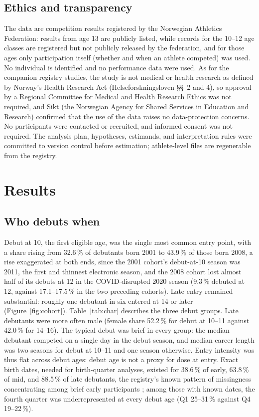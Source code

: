 \documentclass[12pt,a4paper]{article}
\begin{document}
\subsection{Ethics and transparency}

The data are competition results registered by the Norwegian Athletics Federation: results from age 13 are publicly listed, while records for the 10--12 age classes are registered but not publicly released by the federation, and for those ages only participation itself (whether and when an athlete competed) was used. No individual is identified and no performance data were used. As for the companion registry studies, the study is not medical or health research as defined by Norway's Health Research Act (Helseforskningsloven \S\S~2 and 4), so approval by a Regional Committee for Medical and Health Research Ethics was not required, and Sikt (the Norwegian Agency for Shared Services in Education and Research) confirmed that the use of the data raises no data-protection concerns. No participants were contacted or recruited, and informed consent was not required. The analysis plan, hypotheses, estimands, and interpretation rules were committed to version control before estimation; athlete-level files are regenerable from the registry.

\section{Results}

\subsection{Who debuts when}

Debut at 10, the first eligible age, was the single most common entry point, with a share rising from 32.6\,\% of debutants born 2001 to 43.9\,\% of those born 2008, a rise exaggerated at both ends, since the 2001 cohort's debut-at-10 season was 2011, the first and thinnest electronic season, and the 2008 cohort lost almost half of its debuts at 12 in the COVID-disrupted 2020 season (9.3\,\% debuted at 12, against 17.1--17.5\,\% in the two preceding cohorts). Late entry remained substantial: roughly one debutant in six entered at 14 or later (Figure~\ref{fig:cohort}). Table~\ref{tab:char} describes the three debut groups. Late debutants were more often male (female share 52.2\,\% for debut at 10--11 against 42.0\,\% for 14--16). The typical debut was brief in every group: the median debutant competed on a single day in the debut season, and median career length was two seasons for debut at 10--11 and one season otherwise. Entry intensity was thus flat across debut ages: debut age is not a proxy for dose at entry. Exact birth dates, needed for birth-quarter analyses, existed for 38.6\,\% of early, 63.8\,\% of mid, and 88.5\,\% of late debutants, the registry's known pattern of missingness concentrating among brief early participants \cite{guttormsen2026rae}; among those with known dates, the fourth quarter was underrepresented at every debut age (Q1 25--31\,\% against Q4 19--22\,\%).
\end{document}
